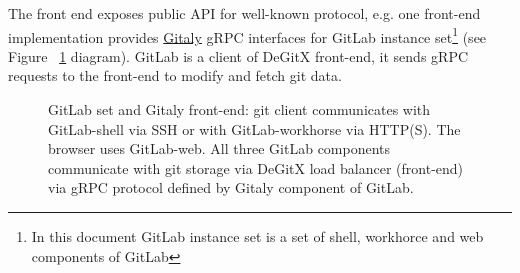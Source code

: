 \documentclass[acmlarge, screen, nonacm]{acmart}
\begin{document}
The front end exposes public API for well-known protocol, e.g. one front-end implementation provides
\href{https://docs.gitlab.com/ee/administration/gitaly/}{Gitaly} gRPC interfaces for GitLab
instance set\footnote{In this document GitLab instance set is a set of shell, workhorce and web components of GitLab}
(see Figure ~\ref{fig:gitlab-set} diagram). GitLab is a client of DeGitX front-end, it sends gRPC requests to the
front-end to modify and fetch git data.

\begin{figure}
  \begin{center}
  \end{center}
  \caption{
    GitLab set and Gitaly front-end:
    git client communicates with GitLab-shell via SSH or with GitLab-workhorse via HTTP(S).
    The browser uses GitLab-web. All three GitLab components communicate with git storage via DeGitX load balancer
    (front-end) via gRPC protocol defined by Gitaly component of GitLab.
  }
  \label{fig:gitlab-set}
\end{figure}
\end{document}
